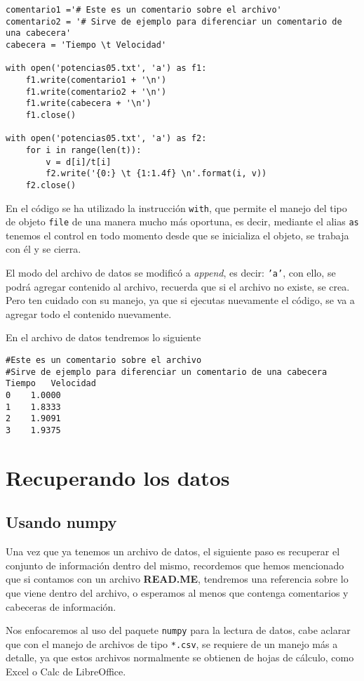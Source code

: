 \documentclass[12pt]{article}
\begin{document}
{\begin{verbatim}
comentario1 ='# Este es un comentario sobre el archivo'
comentario2 = '# Sirve de ejemplo para diferenciar un comentario de una cabecera'
cabecera = 'Tiempo \t Velocidad'

with open('potencias05.txt', 'a') as f1:
    f1.write(comentario1 + '\n')
    f1.write(comentario2 + '\n')
    f1.write(cabecera + '\n')
    f1.close()
    
with open('potencias05.txt', 'a') as f2:
    for i in range(len(t)):
        v = d[i]/t[i] 
        f2.write('{0:} \t {1:1.4f} \n'.format(i, v))
    f2.close()
\end{verbatim}
En el código se ha utilizado la instrucción \texttt{with}, que permite el manejo del tipo de objeto \texttt{file} de una manera mucho más oportuna, es decir, mediante el alias \texttt{as} tenemos el control en todo momento desde que se inicializa el objeto, se trabaja con él y se cierra.
\par
El modo del archivo de datos se modificó a \emph{append}, es decir: \texttt{'a'}, con ello, se podrá agregar contenido al archivo, recuerda que si el archivo no existe, se crea. Pero ten cuidado con su manejo, ya que si ejecutas nuevamente el código, se va a agregar todo el contenido nuevamente.
\par
En el archivo de datos tendremos lo siguiente
\begin{verbatim}
#Este es un comentario sobre el archivo
#Sirve de ejemplo para diferenciar un comentario de una cabecera
Tiempo 	 Velocidad
0 	 1.0000 
1 	 1.8333 
2 	 1.9091 
3 	 1.9375 
\end{verbatim}
\section{Recuperando los datos}
\subsection{Usando numpy}
Una vez que ya tenemos un archivo de datos, el siguiente paso es recuperar el conjunto de información dentro del mismo, recordemos que hemos mencionado que si contamos con un archivo \textbf{READ.ME}, tendremos una referencia sobre lo que viene dentro del archivo, o esperamos al menos que contenga comentarios y cabeceras de información.
\par
Nos enfocaremos al uso del paquete \texttt{numpy} para la lectura de datos, cabe aclarar que con el manejo de archivos de tipo \texttt{*.csv}, se requiere de un manejo más a detalle, ya que estos archivos normalmente se obtienen de hojas de cálculo, como Excel o Calc de LibreOffice.
}
\end{document}
